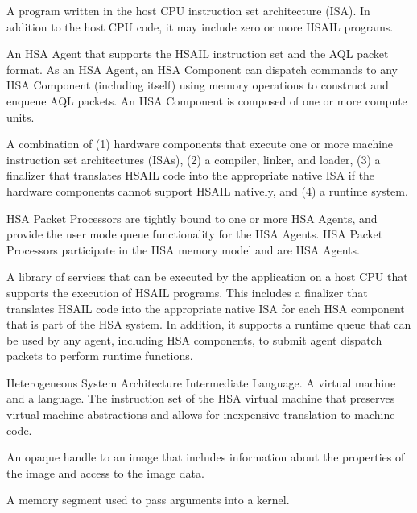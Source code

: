\documentclass[final,oneside]{book}
\begin{document}
\begin{description}[itemsep=5pt,leftmargin=0cm, labelindent=0cm]
\item[HSA application] A program written in the host CPU instruction set
  architecture (ISA). In addition to the host CPU code, it may include zero or
  more HSAIL programs.

\item[HSA Component] An HSA Agent that supports the HSAIL instruction set and
  the AQL packet format. As an HSA Agent, an HSA Component can dispatch commands
  to any HSA Component (including itself) using memory operations to construct
  and enqueue AQL packets. An HSA Component is composed of one or more compute
  units.

\item[HSA implementation] A combination of (1) hardware components that execute
  one or more machine instruction set architectures (ISAs), (2) a compiler,
  linker, and loader, (3) a finalizer that translates HSAIL code into the
  appropriate native ISA if the hardware components cannot support HSAIL
  natively, and (4) a runtime system.

\item[HSA Packet Processor] HSA Packet Processors are tightly bound to one or
  more HSA Agents, and provide the user mode queue functionality for the HSA
  Agents. HSA Packet Processors participate in the HSA memory model and are HSA
  Agents.

\item[HSA runtime] A library of services that can be executed by the application
  on a host CPU that supports the execution of HSAIL programs. This includes a
  finalizer that translates HSAIL code into the appropriate native ISA for each
  HSA component that is part of the HSA system. In addition, it supports a
  runtime queue that can be used by any agent, including HSA components, to
  submit agent dispatch packets to perform runtime functions.

\item[HSAIL] Heterogeneous System Architecture Intermediate Language. A virtual
  machine and a language. The instruction set of the HSA virtual machine that
  preserves virtual machine abstractions and allows for inexpensive translation
  to machine code.

\item[Image handle] An opaque handle to an image that includes information about
  the properties of the image and access to the image data.

\item[Kernarg segment] A memory segment used to pass arguments into a kernel.


\end{description}
\end{document}
